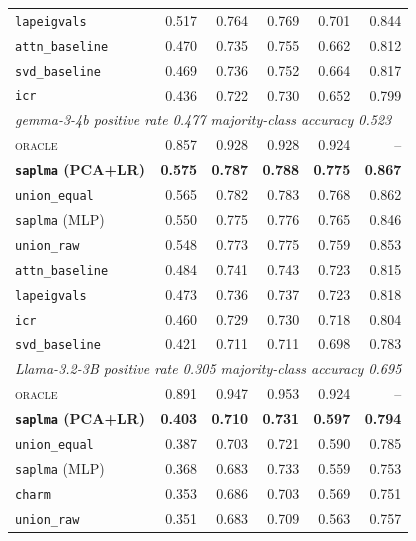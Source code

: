 \begin{table}[t]
\begin{tabular}{l r r r r r}
    \texttt{lapeigvals}            & 0.517 & 0.764 & 0.769 & 0.701 & 0.844 \\
    \texttt{attn\_baseline}        & 0.470 & 0.735 & 0.755 & 0.662 & 0.812 \\
    \texttt{svd\_baseline}         & 0.469 & 0.736 & 0.752 & 0.664 & 0.817 \\
    \texttt{icr}                   & 0.436 & 0.722 & 0.730 & 0.652 & 0.799 \\
    \midrule
    \multicolumn{6}{l}{\itshape gemma-3-4b \quad positive rate 0.477 \quad majority-class accuracy 0.523} \\
    \textsc{oracle}                & 0.857 & 0.928 & 0.928 & 0.924 & -- \\
    \textbf{\texttt{saplma} (PCA+LR)} & \textbf{0.575} & \textbf{0.787} & \textbf{0.788} & \textbf{0.775} & \textbf{0.867} \\
    \texttt{union\_equal}          & 0.565 & 0.782 & 0.783 & 0.768 & 0.862 \\
    \texttt{saplma} (MLP)          & 0.550 & 0.775 & 0.776 & 0.765 & 0.846 \\
    \texttt{union\_raw}            & 0.548 & 0.773 & 0.775 & 0.759 & 0.853 \\
    \texttt{attn\_baseline}        & 0.484 & 0.741 & 0.743 & 0.723 & 0.815 \\
    \texttt{lapeigvals}            & 0.473 & 0.736 & 0.737 & 0.723 & 0.818 \\
    \texttt{icr}                   & 0.460 & 0.729 & 0.730 & 0.718 & 0.804 \\
    \texttt{svd\_baseline}         & 0.421 & 0.711 & 0.711 & 0.698 & 0.783 \\
    \midrule
    \multicolumn{6}{l}{\itshape Llama-3.2-3B \quad positive rate 0.305 \quad majority-class accuracy 0.695} \\
    \textsc{oracle}                & 0.891 & 0.947 & 0.953 & 0.924 & -- \\
    \textbf{\texttt{saplma} (PCA+LR)} & \textbf{0.403} & \textbf{0.710} & \textbf{0.731} & \textbf{0.597} & \textbf{0.794} \\
    \texttt{union\_equal}          & 0.387 & 0.703 & 0.721 & 0.590 & 0.785 \\
    \texttt{saplma} (MLP)          & 0.368 & 0.683 & 0.733 & 0.559 & 0.753 \\
    \texttt{charm}                 & 0.353 & 0.686 & 0.703 & 0.569 & 0.751 \\
    \texttt{union\_raw}            & 0.351 & 0.683 & 0.709 & 0.563 & 0.757 \\

\end{tabular}
\end{table}
